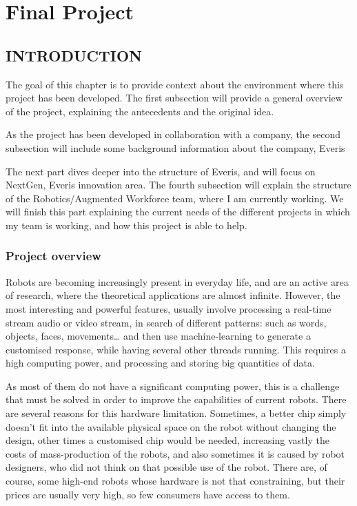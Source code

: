 \documentclass[]{article}
\date{}
\begin{document}
\hypertarget{final-project}{%
\section{Final Project}\label{final-project}}

\hypertarget{introduction}{%
\subsection{INTRODUCTION}\label{introduction}}

The goal of this chapter is to provide context about the environment
where this project has been developed. The first subsection will provide
a general overview of the project, explaining the antecedents and the
original idea.

As the project has been developed in collaboration with a company, the
second subsection will include some background information about the
company, Everis

The next part dives deeper into the structure of Everis, and will focus
on NextGen, Everis innovation area. The fourth subsection will explain
the structure of the Robotics/Augmented Workforce team, where I am
currently working. We will finish this part explaining the current needs
of the different projects in which my team is working, and how this
project is able to help.

\hypertarget{project-overview}{%
\subsubsection{Project overview}\label{project-overview}}

Robots are becoming increasingly present in everyday life, and are an
active area of research, where the theoretical applications are almost
infinite. However, the most interesting and powerful features, usually
involve processing a real-time stream audio or video stream, in search
of different patterns: such as words, objects, faces, movements\ldots{}
and then use machine-learning to generate a customised response, while
having several other threads running. This requires a high computing
power, and processing and storing big quantities of data.

As most of them do not have a significant computing power, this is a
challenge that must be solved in order to improve the capabilities of
current robots. There are several reasons for this hardware limitation.
Sometimes, a better chip simply doesn't fit into the available physical
space on the robot without changing the design, other times a customised
chip would be needed, increasing vastly the costs of mass-production of
the robots, and also sometimes it is caused by robot designers, who did
not think on that possible use of the robot. There are, of course, some
high-end robots whose hardware is not that constraining, but their
prices are usually very high, so few consumers have access to them.
\end{document}

